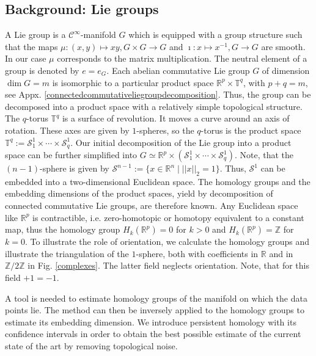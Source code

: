 \documentclass[envcountsect,runningheads]{llncs}
\begin{document}
\subsection{Background: Lie groups}
\label{liegroups}
A Lie group is a $\mathcal{C}^\infty$-manifold $G$ which is equipped with a group structure such that the maps $\mu:(x,y) \mapsto xy, G \times G \rightarrow G$ and $\imath: x \mapsto x^{-1}, G \rightarrow G$ are smooth. In our case $\mu$ corresponds to the matrix multiplication. The neutral element of a group is denoted by $e = e_G$. Each abelian commutative Lie group $G$ of dimension $\dim G = m$ is isomorphic to a particular product space $\mathbb{R}^p \times \mathbb{T}^q$, with $p + q = m$, see Appx. \ref{connectedcommutativeliegroupdecomposition}. Thus, the group can be decomposed into a product space with a relatively simple topological structure. The $q$-torus $\mathbb{T}^q$ is a surface of revolution. It moves a curve around an axis of rotation. These axes are given by $1$-spheres, so the $q$-torus is the product space $\mathbb{T}^q := \mathcal{S}^1_1 \times \cdots \times \mathcal{S}^1_q$. Our initial decomposition of the Lie group into a product space can be further simplified into $G \simeq \mathbb{R}^p \times (\mathcal{S}^1_1 \times \cdots \times \mathcal{S}^1_q)$. Note, that the $(n-1)$-sphere is given by $\mathcal{S}^{n-1} := \{x \in \mathbb{R}^n \; \vert \; ||x||_2 = 1\}$. Thus, $\mathcal{S}^1$ can be embedded into a two-dimensional Euclidean space. The homology groups and the embedding dimensions of the product spaces, yield by decomposition of connected commutative Lie groups, are therefore known. Any Euclidean space like $\mathbb{R}^p$ is contractible, i.e. zero-homotopic or homotopy equivalent to a constant map, thus the homology group $H_k(\mathbb{R}^p) = 0$ for $k > 0$ and $H_k(\mathbb{R}^p) = \mathbb{Z}$ for $k = 0$. To illustrate the role of orientation, we calculate the homology groups and illustrate the triangulation of the $1$-sphere, both with coefficients in $\mathbb{R}$ and in $\mathbb{Z}/2\mathbb{Z}$ in Fig. \ref{complexes}. The latter field neglects orientation. Note, that for this field $+1 = -1$.

A tool is needed to estimate homology groups of the manifold on which the data points lie. The method can then be inversely applied to the homology groups to estimate its embedding dimension. We introduce persistent homology with its confidence intervals in order to obtain the best possible estimate of the current state of the art by removing topological noise.
\end{document}
